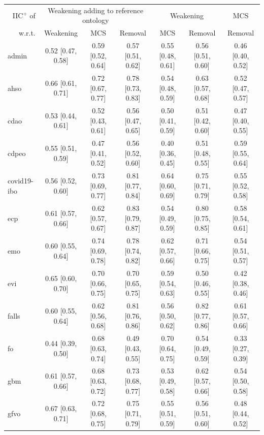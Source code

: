 \begin{table}[htbp]
  \scriptsize
  \begin{widepage}
    \centering
    \begin{tabular}{|l|cccccc|}
      \cline{2-7}
      \multicolumn{1}{r|}{IIC$^+$ of} & \multicolumn{3}{c}{Weakening adding to reference ontology} & \multicolumn{2}{c}{Weakening} & MCS \\
      \multicolumn{1}{r|}{w.r.t.} & Weakening & MCS & Removal & MCS & Removal & Removal \\
      \hline
      admin & 0.52 [0.47, 0.58] & 0.59 [0.52, 0.64] & 0.57 [0.51, 0.62] & 0.55 [0.48, 0.61] & 0.56 [0.51, 0.60] & 0.46 [0.40, 0.52] \\
      ahso & 0.66 [0.61, 0.71] & 0.72 [0.67, 0.77] & 0.78 [0.73, 0.83] & 0.54 [0.48, 0.59] & 0.63 [0.57, 0.68] & 0.52 [0.47, 0.57] \\
      cdao & 0.53 [0.44, 0.61] & 0.52 [0.43, 0.61] & 0.56 [0.47, 0.65] & 0.50 [0.41, 0.59] & 0.51 [0.42, 0.60] & 0.47 [0.40, 0.55] \\
      cdpeo & 0.55 [0.51, 0.59] & 0.47 [0.41, 0.52] & 0.56 [0.52, 0.60] & 0.40 [0.36, 0.45] & 0.51 [0.48, 0.55] & 0.59 [0.55, 0.64] \\
      covid19-ibo & 0.56 [0.52, 0.60] & 0.73 [0.69, 0.77] & 0.81 [0.77, 0.84] & 0.64 [0.60, 0.69] & 0.75 [0.71, 0.79] & 0.55 [0.52, 0.58] \\
      ecp & 0.61 [0.57, 0.66] & 0.62 [0.57, 0.67] & 0.83 [0.79, 0.87] & 0.54 [0.49, 0.59] & 0.80 [0.75, 0.85] & 0.58 [0.54, 0.61] \\
      emo & 0.60 [0.55, 0.64] & 0.74 [0.69, 0.78] & 0.78 [0.74, 0.82] & 0.62 [0.57, 0.66] & 0.71 [0.66, 0.75] & 0.54 [0.51, 0.57] \\
      evi & 0.65 [0.60, 0.70] & 0.70 [0.66, 0.75] & 0.70 [0.65, 0.75] & 0.59 [0.54, 0.63] & 0.50 [0.46, 0.55] & 0.42 [0.38, 0.46] \\
      falls & 0.60 [0.55, 0.64] & 0.62 [0.56, 0.68] & 0.81 [0.76, 0.86] & 0.56 [0.50, 0.62] & 0.82 [0.77, 0.86] & 0.61 [0.57, 0.66] \\
      fo & 0.44 [0.39, 0.50] & 0.68 [0.63, 0.74] & 0.49 [0.43, 0.55] & 0.70 [0.64, 0.75] & 0.54 [0.49, 0.59] & 0.33 [0.27, 0.39] \\
      gbm & 0.61 [0.57, 0.66] & 0.68 [0.63, 0.72] & 0.73 [0.68, 0.77] & 0.53 [0.49, 0.58] & 0.62 [0.57, 0.66] & 0.54 [0.50, 0.58] \\
      gfvo & 0.67 [0.63, 0.71] & 0.72 [0.68, 0.75] & 0.75 [0.71, 0.79] & 0.55 [0.51, 0.59] & 0.56 [0.51, 0.60] & 0.48 [0.44, 0.52] \\

\end{tabular}
\end{widepage}
\end{table}
